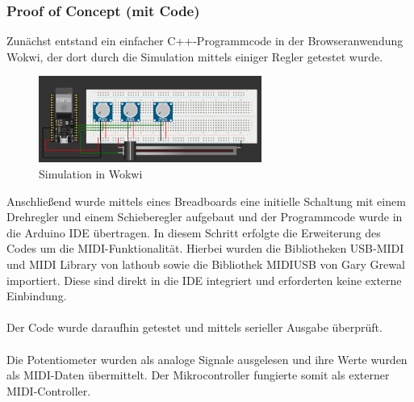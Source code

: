 \documentclass[12pt]{scrartcl}%
\theoremstyle{nonumberplain}
\begin{document}
\subsubsection{Proof of Concept (mit Code)}

Zunächst entstand ein einfacher C++-Programmcode in der Browseranwendung Wokwi, der dort durch die Simulation mittels einiger Regler getestet wurde.\\

\begin{figure}
  \centering
  \includegraphics[width=0.65\textwidth]{wokwi}
  \caption{Simulation in Wokwi}
\end{figure}

\noindent Anschließend wurde mittels eines Breadboards eine initielle Schaltung mit einem Drehregler und einem Schieberegler aufgebaut und der Programmcode wurde in die Arduino IDE übertragen.
\noindent In diesem Schritt erfolgte die Erweiterung des Codes um die MIDI-Funktionalität. Hierbei wurden die Bibliotheken USB-MIDI und MIDI Library von lathoub sowie die Bibliothek MIDIUSB von Gary Grewal importiert. Diese sind direkt in die IDE integriert und erforderten keine externe Einbindung.
\\\\
Der Code wurde daraufhin getestet und mittels serieller Ausgabe überprüft.
\\\\
Die Potentiometer wurden als analoge Signale ausgelesen und ihre Werte wurden als MIDI-Daten übermittelt. Der Mikrocontroller fungierte somit als externer MIDI-Controller.
\end{document}
